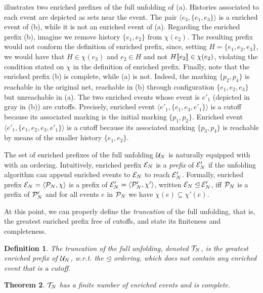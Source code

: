 \documentclass[11pt,a4paper]{article}
\newtheorem{theorem}{Theorem}
\newtheorem{definition}[theorem]{Definition}
\begin{document}
 illustrates two enriched prefixes of the full unfolding of
 (a).  Histories associated to each event are depicted as sets
near the event.  The pair $\langle e_3, \{e_1, e_3\} \rangle$ is a enriched
event of (b), while it is not an enriched event of (a).  Regarding the enriched
prefix (b), imagine we remove history $\{e_1, e_2\}$ from $\chi (e_2)$.  The
resulting prefix would not conform the definition of enriched prefix, since,
setting $H = \{e_1, e_2, e_3\}$, we would have that $H \in \chi (e_3)$ and $e_2
\in H$ and not $H [\![ e_2]\!] \in \chi (e_2)$, violating the condition stated on
$\chi$ in the definition of enriched prefix.  Finally, note that the enriched
prefix (b) is complete, while (a) is not.  Indeed, the marking $\{p_2, p_4\}$
is reachable in the original net, reachable in (b) through configuration
$\{e_1, e_2, e_3\}$ but unreachable in (a).  The two enriched events whose
event is $e'_1$ (depicted in gray in (b)) are cutoffs.  Precisely, enriched
event $\langle e'_1, \{e_1, e_3, e'_1\} \rangle$ is a cutoff because its
associated marking is the initial marking $\{p_1, p_2\}$.  Enriched event
$\langle e'_1, \{e_1, e_2, e_3, e'_1\} \rangle$ is a cutoff because its
associated marking $\{p_3, p_4\}$ is reachable by means of the smaller history
$\{e_1, e_2\}$.

The set of enriched prefixes of the full unfolding $\mathcal{U}_{N}$ is naturally
equipped with with an ordering.  Intuitively, enriched prefix $\mathcal{E}_{N}$ is a
\emph{prefix} of $\mathcal{E}_{N}'$ if the unfolding algorithm can append enriched
events to $\mathcal{E}_{N}$ to reach $\mathcal{E}_{N}'$.  Formally, enriched prefix $\mathcal{E}_{N} =
\langle \mathcal{P}_{N}, \chi \rangle$ is a prefix of $\mathcal{E}_{N}' = \langle \mathcal{P}_{N}',
\chi' \rangle$, written $\mathcal{E}_{N} \unlhd \mathcal{E}_{N}'$, iff $\mathcal{P}_{N}$ is a prefix of
$\mathcal{P}_{N}'$ and for all events $e$ in $\mathcal{P}_{N}$  we have $\chi (e) \subseteq
\chi' (e)$.

At this point, we can properly define the \emph{truncation} of the full
unfolding, that is, the greatest enriched prefix free of cutoffs, and state its
finiteness and completeness.

\begin{definition}
The \emph{truncation} of the full unfolding, denoted $\mathcal{T}_{N}$, is the
greatest enriched prefix of $\mathcal{U}_{N}$, w.r.t. the $\unlhd$ ordering, which does
not contain any enriched event that is a cutoff.
\end{definition}

\begin{theorem}
\label{thm:trunc.has}
$\mathcal{T}_{N}$ has a finite number of enriched events and is complete.
\end{theorem}
\end{document}
